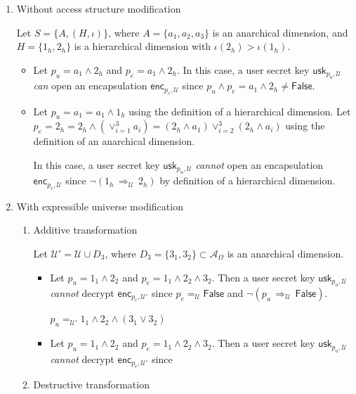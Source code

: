 \documentclass[a4paper]{article}
\theoremstyle{definition}
\newcommand{\usk}[2]{\mathsf{usk}_{#1,#2}}
\newcommand{\enc}[2]{\mathsf{enc}_{#1,#2}}
\newcommand{\iwrt}[1]{\,\Longrightarrow_{#1}\,}
\newcommand{\attr}[2]{#1_{#2}}
\newcommand{\cA}{\mathcal{A}}
\newcommand{\cU}{\mathcal{U}}
\newcommand{\False}{\mathsf{False}}
\begin{document}
\begin{enumerate}
\item Without access structure modification
\label{sec:org0a167df}

Let \(S = \{A, (H, \iota)\}\), where \(A = \{ \attr{a}{1}, \attr{a}{2}, \attr{a}{3}
\}\) is an  anarchical dimension, and \(H  = \{ \attr{1}{h}, \attr{2}{h}  \}\) is a
hierarchical dimension with \(\iota(\attr{2}{h}) > \iota(\attr{1}{h})\).

\begin{itemize}
\item Let  \(p_u  = \attr{a}{1}  \land  \attr{2}{h}\)  and  \(p_e =  \attr{a}{1}  \land
  \attr{2}{h}\). In this  case, a user secret key \(\usk{p_u}{\cU}\)  \emph{can} open an
encapsulation  \(\enc{p_e}{\cU}\)  since  \(p_u  \land p_e  =  \attr{a}{1}  \land
  \attr{2}{h} \ne \False\).

\item Let \(p_u =  \attr{a}{1} = \attr{a}{1} \land \attr{1}{h}\)  using the definition
of a hierarchical dimension. Let \(p_e = \attr{2}{h} = \attr{2}{h} \land \left(
  \lor_{i=1}^{3}   \attr{a}{i}  \right)   =   (\attr{2}{h}  \land   \attr{a}{1})
  \lor_{i=2}^{3}  \left(  \attr{2}{h}  \land   \attr{a}{i}  \right)\)  using  the
definition of an anarchical dimension.

In  this   case,  a  user   secret  key  \(\usk{p_u}{\cU}\)  \emph{cannot}   open  an
encapsulation   \(\enc{p_e}{\cU}\)    since   \(\neg    (\attr{1}{h}   \iwrt{\cU}
  \attr{2}{h})\) by definition of a hierarchical dimension.
\end{itemize}
\item With expressible universe modification
\label{sec:org0c06f0e}

\begin{enumerate}
\item Additive transformation
\label{sec:org58e6592}

Let \(\cU' = \cU  \cup D_3\), where \(D_3 = \{  \attr{3}{1}, \attr{3}{2} \} \subset
\cA_\Omega\) is an anarchical dimension.
\begin{itemize}
\item Let  \(p_u  = \attr{1}{1}  \land  \attr{2}{2}\)  and  \(p_e =  \attr{1}{1}  \land
  \attr{2}{2}  \land  \attr{3}{2}\).  Then  a  user  secret key  \(\usk{p_u}{\cU}\)
\emph{cannot} decrypt  \(\enc{p_e}{\cU'}\) since  \(p_e =_{\cU} \False\)  and \(\neg(p_u
  \iwrt{\cU} \False)\).

\(p_u   =_{\cU'}  \attr{1}{1}   \land  \attr{2}{2}   \land  (\attr{3}{1}   \lor
  \attr{3}{2})\)

\item Let  \(p_u  = \attr{1}{1}  \land  \attr{2}{2}\)  and  \(p_e =  \attr{1}{1}  \land
  \attr{2}{2}  \land  \attr{3}{2}\).  Then  a user  secret  key  \(\usk{p_u}{\cU}\)
\emph{cannot} decrypt \(\enc{p_e}{\cU'}\) since
\end{itemize}
\item Destructive transformation
\label{sec:org53b21db}
\end{enumerate}
\end{enumerate}
\end{document}
